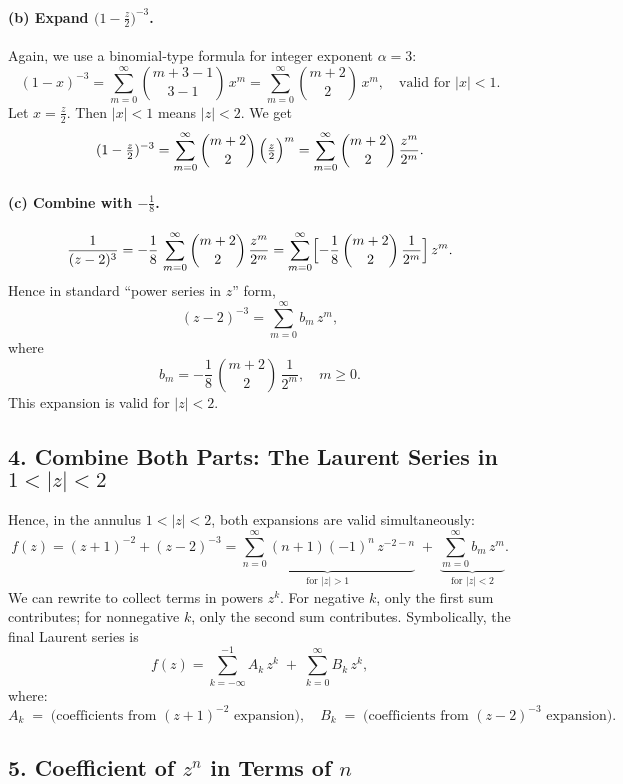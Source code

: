 \documentclass[12pt]{article}
\theoremstyle{definition} %
\theoremstyle{plain} %
\begin{document}
\paragraph{(b) Expand \(\bigl(1 - \tfrac{z}{2}\bigr)^{-3}\).}
Again, we use a binomial‐type formula for integer exponent \(\alpha=3\):
\[
(1 - x)^{-3}
= \sum_{m=0}^\infty \binom{m+3-1}{3-1}\,x^m
= \sum_{m=0}^\infty \binom{m+2}{2}\,x^m,
\quad \text{valid for }|x|<1.
\]
Let \(x=\tfrac{z}{2}\). Then \(|x|<1\) means \(|z|<2\).  We get
\[
(1 - \tfrac{z}{2})^{-3}
= \sum_{m=0}^\infty \binom{m+2}{2}\,\Bigl(\tfrac{z}{2}\Bigr)^m
= \sum_{m=0}^\infty \binom{m+2}{2}\,\frac{z^m}{2^m}.
\]

\paragraph{(c) Combine with \(-\tfrac{1}{8}\).}
\[
\frac{1}{(z-2)^3}
= -\frac{1}{8}\,\sum_{m=0}^\infty \binom{m+2}{2}\,\frac{z^m}{2^m}
= \sum_{m=0}^\infty \Bigl[-\frac{1}{8}\,\binom{m+2}{2}\,\frac{1}{2^m}\Bigr]\,z^m.
\]
Hence in standard “power series in \(z\)” form,
\[
(z-2)^{-3} 
= \sum_{m=0}^\infty b_m \, z^m,
\]
where
\[
b_m 
= -\frac{1}{8}\,\binom{m+2}{2}\,\frac{1}{2^m},
\quad m\ge 0.
\]
This expansion is valid for \(|z|<2\).

\bigskip

\subsection*{4. Combine Both Parts: The Laurent Series in \(1<|z|<2\)}

Hence, in the annulus \(1<|z|<2\), both expansions are valid simultaneously:
\[
f(z) = (z+1)^{-2} + (z-2)^{-3}
= \underbrace{\sum_{n=0}^\infty (n+1)(-1)^n\,z^{-2-n}}_{\text{for }|z|>1}
\;+\;
\underbrace{\sum_{m=0}^\infty b_m\,z^m}_{\text{for }|z|<2}.
\]
We can rewrite to collect terms in powers \(z^k\). For negative \(k\), only the first sum contributes; for nonnegative \(k\), only the second sum contributes. Symbolically, the final Laurent series is
\[
f(z) = \sum_{k=-\infty}^{-1} A_k\,z^k \;+\; \sum_{k=0}^{\infty} B_k\,z^k,
\]
where:
\[
A_k \;=\; \text{(coefficients from $(z+1)^{-2}$ expansion)},
\quad
B_k \;=\; \text{(coefficients from $(z-2)^{-3}$ expansion)}.
\]

\bigskip

\subsection*{5. Coefficient of \(z^n\) in Terms of \(n\)}
\end{document}

